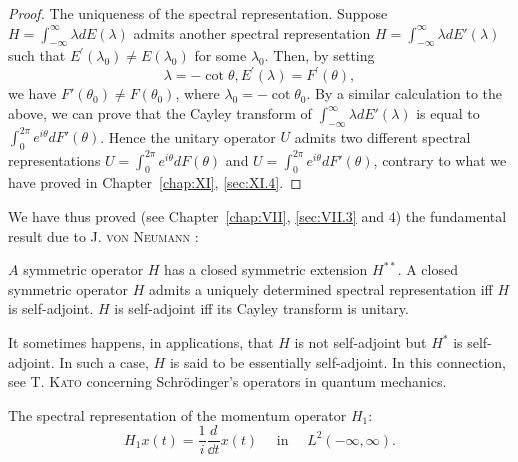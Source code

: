 \begin{proof}
The uniqueness of the spectral representation. Suppose $H = \int_{-\infty}^{\infty} \lambda dE(\lambda)$ admits another spectral representation $H = \int_{-\infty}^{\infty} \lambda dE'(\lambda)$ such that 
$E^{\prime}(\lambda_{0})\neq E(\lambda_{0})$ for some $\lambda_0$. Then, by setting 
\[
\lambda = - \cot \theta , E ^{\prime} (\lambda) = F ^{\prime} (\theta),
\]
we have $F'(\theta_0) \neq F(\theta_0)$, where $\lambda_0 = -\cot \theta_0$. By a similar calculation to the above, we can prove that the Cayley transform of $\int_{-\infty}^{\infty} \lambda dE'(\lambda)$ is equal to $\int_{0}^{2\pi} e^{i\theta} dF'(\theta)$. Hence the unitary operator $U$ admits two different spectral representations $U = \int_{0}^{2\pi} e^{i\theta} dF(\theta)$ and $U = \int_{0}^{2\pi} e^{i\theta} dF'(\theta)$, contrary to what we have proved in Chapter~\ref{chap:XI}, \ref{sec:XI.4}. 
\end{proof}

We have thus proved (see Chapter~\ref{chap:VII}, \ref{sec:VII.3} and $4$) the fundamental result due to J. \textsc{von} \textsc{Neumann} \cite{neumann228}: 


\begin{theorem}\label{thm:XI.6.Theorem.2} $A$ symmetric operator $H$ has a closed symmetric extension $H^{**}$. A closed symmetric operator $H$ admits a uniquely determined spectral representation iff $H$ is self-adjoint. $H$ is self-adjoint iff its Cayley transform is unitary. 
\end{theorem}

\begin{remarku} It sometimes happens, in applications, that $H$ is not self-adjoint but $H^{*}$ is self-adjoint. In such a case, $H$ is said to be essentially self-adjoint. In this connection, see T. \textsc{Kato} \cite{kato140} concerning Schrödinger's operators in quantum mechanics. 
\end{remarku}

The spectral representation of the momentum operator $H_{1}$: 
\[
H _{1} x (t) = \frac {1}{i} \frac {d}{\dd t} x (t) \quad \text{ in } \quad L ^{2} (- \infty , \infty).
\]

